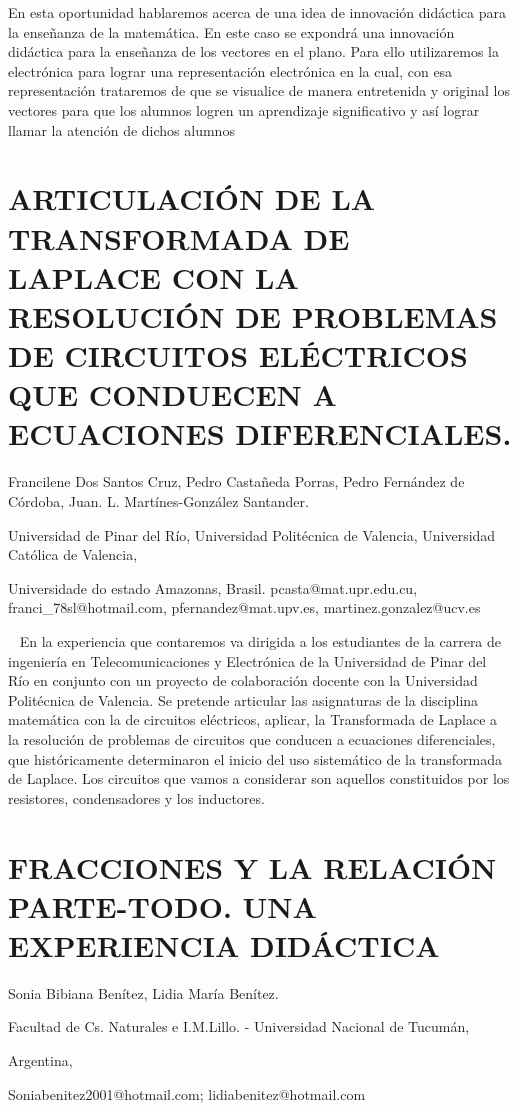 En esta oportunidad hablaremos acerca de una idea de innovación didáctica
para la enseñanza de la matemática. En este caso se expondrá una innovación
didáctica para la enseñanza de los vectores en el plano. Para ello
utilizaremos la electrónica para lograr una representación electrónica
en la cual, con esa representación trataremos de que se visualice
de manera entretenida y original los vectores para que los alumnos
logren un aprendizaje significativo y así lograr llamar la atención
de dichos alumnos 


\section{ARTICULACIÓN DE LA TRANSFORMADA DE LAPLACE CON LA RESOLUCIÓN DE PROBLEMAS
DE CIRCUITOS ELÉCTRICOS QUE CONDUECEN A ECUACIONES DIFERENCIALES.}

\begin{datos}

Francilene Dos Santos Cruz, Pedro Castañeda Porras, Pedro Fernández
de Córdoba, Juan. L. Martínes-González Santander.

Universidad de Pinar del Río, Universidad Politécnica de Valencia,
Universidad Católica de Valencia,

Universidade do estado Amazonas, Brasil. pcasta@mat.upr.edu.cu, franci\_78sl@hotmail.com,
pfernandez@mat.upv.es, martinez.gonzalez@ucv.es

\end{datos}

  En la experiencia que contaremos va dirigida a los estudiantes de
la carrera de ingeniería en Telecomunicaciones y Electrónica de la
Universidad de Pinar del Río en conjunto con un proyecto de colaboración
docente con la Universidad Politécnica de Valencia. Se pretende articular
las asignaturas de la disciplina matemática con la de circuitos eléctricos,
aplicar, la Transformada de Laplace a la resolución de problemas de
circuitos que conducen a ecuaciones diferenciales, que históricamente
determinaron el inicio del uso sistemático de la transformada de Laplace.
Los circuitos que vamos a considerar son aquellos constituidos por
los resistores, condensadores y los inductores.


\section{\uppercase{ Fracciones y la relación parte-todo. Una experiencia
didáctica}}

\begin{datos}

Sonia Bibiana Benítez, Lidia María Benítez.

Facultad de Cs. Naturales e I.M.Lillo. - Universidad Nacional de Tucumán,

Argentina,

Soniabenitez2001@hotmail.com; lidiabenitez@hotmail.com

\end{datos}

